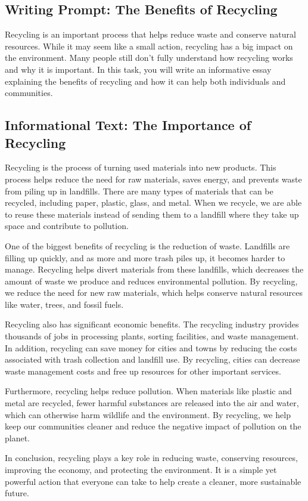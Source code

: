 \documentclass[12pt]{article}
\begin{document}
\onehalfspacing

\subsection*{Writing Prompt: The Benefits of Recycling}

Recycling is an important process that helps reduce waste and conserve natural resources. While it may seem like a small action, recycling has a big impact on the environment. Many people still don't fully understand how recycling works and why it is important. In this task, you will write an informative essay explaining the benefits of recycling and how it can help both individuals and communities.

\subsection*{Informational Text: The Importance of Recycling}

\begin{tcolorbox}[colframe=black!40, colback=gray!5]
\begin{spacing}{1.15}
    Recycling is the process of turning used materials into new products. This process helps reduce the need for raw materials, saves energy, and prevents waste from piling up in landfills. There are many types of materials that can be recycled, including paper, plastic, glass, and metal. When we recycle, we are able to reuse these materials instead of sending them to a landfill where they take up space and contribute to pollution.

    One of the biggest benefits of recycling is the reduction of waste. Landfills are filling up quickly, and as more and more trash piles up, it becomes harder to manage. Recycling helps divert materials from these landfills, which decreases the amount of waste we produce and reduces environmental pollution. By recycling, we reduce the need for new raw materials, which helps conserve natural resources like water, trees, and fossil fuels.

    Recycling also has significant economic benefits. The recycling industry provides thousands of jobs in processing plants, sorting facilities, and waste management. In addition, recycling can save money for cities and towns by reducing the costs associated with trash collection and landfill use. By recycling, cities can decrease waste management costs and free up resources for other important services.

    Furthermore, recycling helps reduce pollution. When materials like plastic and metal are recycled, fewer harmful substances are released into the air and water, which can otherwise harm wildlife and the environment. By recycling, we help keep our communities cleaner and reduce the negative impact of pollution on the planet.

    In conclusion, recycling plays a key role in reducing waste, conserving resources, improving the economy, and protecting the environment. It is a simple yet powerful action that everyone can take to help create a cleaner, more sustainable future.
\end{spacing}
\end{tcolorbox}
\end{document}
